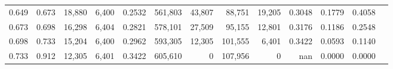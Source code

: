 \begin{tabular}{rrrrrrrrrrrrr}
0.649 & 0.673 & 18,880 & 6,400 &                                     0.2532 & 561,803 &  43,807 &  88,751 &  19,205 & 0.3048 & 0.1779 & 0.4058 \\
0.673 & 0.698 & 16,298 & 6,404 &                                     0.2821 & 578,101 &  27,509 &  95,155 &  12,801 & 0.3176 & 0.1186 & 0.2548 \\
0.698 & 0.733 & 15,204 & 6,400 &                                     0.2962 & 593,305 &  12,305 & 101,555 &   6,401 & 0.3422 & 0.0593 & 0.1140 \\
0.733 & 0.912 & 12,305 & 6,401 &                                     0.3422 & 605,610 &       0 & 107,956 &       0 &    nan & 0.0000 & 0.0000 \\
\bottomrule
\end{tabular}
